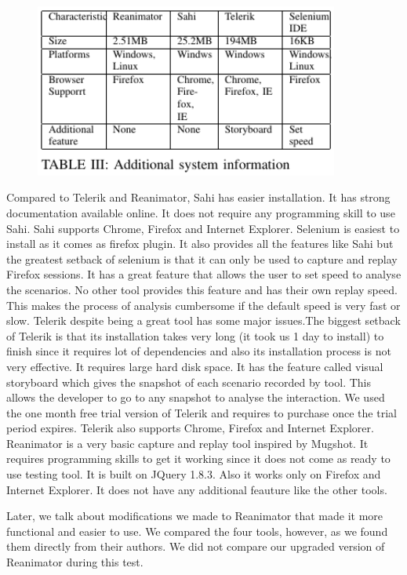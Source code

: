 \documentclass[12pt,journal]{IEEEtran}
\begin{document}
\begin{figure}[h!]
\centering
 \hfill\includegraphics[width=10cm]{figures/table3.PNG}\hspace*{\fill}
\end{figure}
\par
Compared to Telerik and Reanimator, Sahi has easier installation. It has strong documentation available online. It does not require any programming skill to use Sahi. Sahi supports Chrome, Firefox and Internet Explorer. Selenium is easiest to install as it comes as firefox plugin. It also provides all the features like Sahi but the greatest setback of selenium is that it can only be used to capture and replay Firefox sessions. It has a great feature that allows the user to set speed to analyse the scenarios. No other tool provides this feature and has their own replay speed. This makes the process of analysis cumbersome if the default speed is very fast or slow. Telerik despite being a great tool has some major issues.The biggest setback of Telerik is that its installation takes very long (it took us 1 day to install) to finish since it requires lot of dependencies and also its installation process is not very effective. It requires large hard disk space. It has the feature called visual storyboard which gives the snapshot of each scenario recorded by tool. This allows the developer to go to any snapshot to analyse the interaction. We used the one month free trial version of Telerik and requires to purchase once the trial period expires. Telerik also supports Chrome, Firefox and Internet Explorer. Reanimator is a very basic capture and replay tool inspired by Mugshot. It requires programming skills to get it working since it does not come as ready to use testing tool. It is built on JQuery 1.8.3. Also it works only on Firefox and Internet Explorer. It does not have any additional feauture like the other tools.
\par
Later, we talk about modifications we made to Reanimator that made it more functional and easier to use. We compared the four tools, however, as we found them directly from their authors. We did not compare our upgraded version of Reanimator during this test.
\end{document}
